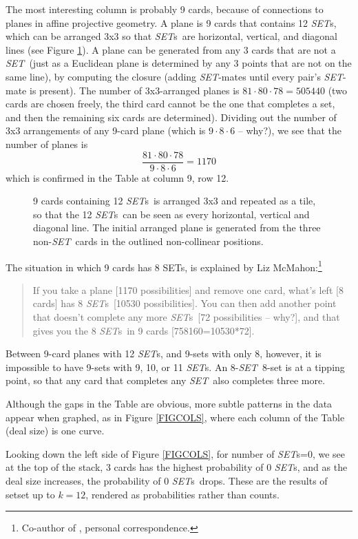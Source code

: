 \documentclass{article}
\theoremstyle{theorem}
\theoremstyle{definition}
\newcommand{\SET}{{\em SET}}
\newcommand{\SETs}{{\em SET}s}
\newcommand{\SETSETb}{{\sc setset }}
\begin{document}
The most interesting column is probably 9 cards, because of connections to
planes in affine projective geometry. A plane is 9 cards that contains 12 \SETs,
which can be arranged 3x3 so that \SETs~are horizontal, vertical, and diagonal
lines (see Figure \ref{PLANE}). A plane can be generated from any 3 cards that
are not a \SET~(just as a Euclidean plane is determined by any 3 points that are
not on the same line), by computing the closure (adding \SET-mates until every
pair's \SET-mate is present). The number of 3x3-arranged planes is $81\cdot
80\cdot 78=505440$ (two cards are chosen freely, the third card cannot be the
one that completes a set, and then the remaining six cards are
determined). Dividing out the number of 3x3 arrangements of any 9-card plane
(which is $9\cdot 8\cdot 6$ -- why?), we see that the number of planes is
$$\frac{81\cdot 80\cdot 78}{9\cdot 8\cdot 6} = 1170$$
which is confirmed in the Table at column 9, row 12.

\begin{figure}[!htb]
  \caption{\label{PLANE}9 cards containing 12 \SETs~is arranged 3x3 and repeated
    as a tile, so that the 12 \SETs~can be seen as every horizontal, vertical
    and diagonal line. The initial arranged plane is generated from the three
    non-\SET~cards in the outlined non-collinear positions.}
\end{figure}

The situation in which 9 cards has 8 SETs, is explained by Liz
McMahon:\footnote{Co-author of \cite{JOS}, personal correspondence.}
\begin{quote}
If you take a plane [1170 possibilities] and remove one card, what's left [8
  cards] has 8 \SETs~[10530 possibilities].  You can then add another point that
doesn't complete any more \SETs~[72 possibilities -- why?], and that gives you
the 8 \SETs~in 9 cards [758160=10530*72].
\end{quote}
Between 9-card planes with 12 \SETs, and 9-sets with only 8, however, it is
impossible to have 9-sets with 9, 10, or 11 \SETs. An 8-\SET~8-set is at a
tipping point, so that any  card that completes any \SET~also completes
three more.

Although the gaps in the Table are obvious, more subtle patterns in the data
appear when graphed, as in Figure \ref{FIGCOLS}, where each column of the Table
(deal size) is one curve.

Looking down the left side of Figure \ref{FIGCOLS}, for number of \SETs=0, we
see at the top of the stack, 3 cards has the highest probability of 0 \SETs, and
as the deal size increases, the probability of 0 \SETs~drops. These are the
results of \SETSETb up to $k=12$, rendered as probabilities rather than counts. 
\end{document}
